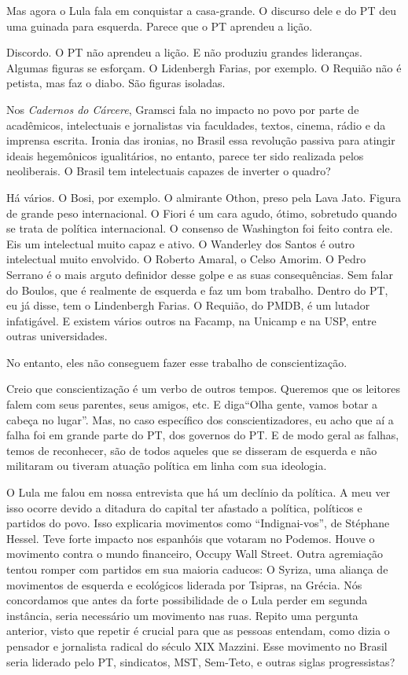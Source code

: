 \falaG Mas agora o Lula fala em conquistar a casa-grande. O discurso dele e
do PT deu uma guinada para esquerda. Parece que o PT aprendeu a lição.

\falaM Discordo. O PT não aprendeu a lição. E não produziu grandes
lideranças. Algumas figuras se esforçam. O Lidenbergh Farias, por
exemplo. O Requião não é petista, mas faz o diabo. São figuras isoladas.

\falaG Nos \emph{Cadernos do Cárcere}, Gramsci fala no impacto no povo por
parte de acadêmicos, intelectuais e jornalistas via faculdades, textos,
cinema, rádio e da imprensa escrita. Ironia das ironias, no Brasil essa
revolução passiva para atingir ideais hegemônicos igualitários, no
entanto, parece ter sido realizada pelos neoliberais. O Brasil tem
intelectuais capazes de inverter o quadro?

\falaM Há vários. O Bosi, por exemplo. O almirante Othon, preso pela Lava
Jato. Figura de grande peso internacional. O Fiori é um cara agudo,
ótimo, sobretudo quando se trata de política internacional. O consenso
de Washington foi feito contra ele. Eis um intelectual muito capaz e
ativo. O Wanderley dos Santos é outro intelectual muito envolvido. O
Roberto Amaral, o Celso Amorim. O Pedro Serrano é o mais arguto
definidor desse golpe e as suas consequências. Sem falar do Boulos, que
é realmente de esquerda e faz um bom trabalho. Dentro do PT, eu já
disse, tem o Lindenbergh Farias. O Requião, do PMDB, é um lutador
infatigável. E existem vários outros na Facamp, na Unicamp e na USP,
entre outras universidades.

\falaG No entanto, eles não conseguem fazer esse trabalho de
conscientização.

\falaM Creio que conscientização é um verbo de outros tempos. Queremos que
os leitores falem com seus parentes, seus amigos, etc. E diga\falaM ``Olha
gente, vamos botar a cabeça no lugar''. Mas, no caso específico dos
conscientizadores, eu acho que aí a falha foi em grande parte do PT, dos
governos do PT. E de modo geral as falhas, temos de reconhecer, são de
todos aqueles que se disseram de esquerda e não militaram ou tiveram
atuação política em linha com sua ideologia.

\falaG O Lula me falou em nossa entrevista que há um declínio da política. A
meu ver isso ocorre devido a ditadura do capital ter afastado a
política, políticos e partidos do povo. Isso explicaria movimentos como
``Indignai-vos'', de Stéphane Hessel. Teve forte impacto nos espanhóis
que votaram no Podemos. Houve o movimento contra o mundo financeiro,
Occupy Wall Street. Outra agremiação tentou romper com partidos em sua
maioria caducos: O Syriza, uma aliança de movimentos de esquerda e
ecológicos liderada por Tsipras, na Grécia. Nós concordamos que antes da
forte possibilidade de o Lula perder em segunda instância, seria
necessário um movimento nas ruas. Repito uma pergunta anterior, visto
que repetir é crucial para que as pessoas entendam, como dizia o
pensador e jornalista radical do século XIX Mazzini. Esse movimento no
Brasil seria liderado pelo PT, sindicatos, MST, Sem-Teto, e outras
siglas progressistas?

